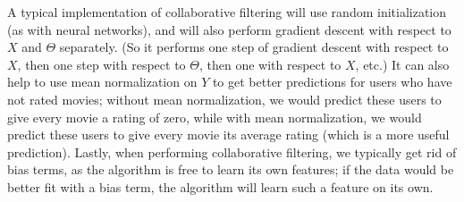 \documentclass{article}
\begin{document}
A typical implementation of collaborative filtering will use random initialization (as with neural networks), and will also perform gradient descent with respect to $X$ and $\Theta$ separately. (So it performs one step of gradient descent with respect to $X$, then one step with respect to $\Theta$, then one with respect to $X$, etc.) It can also help to use mean normalization on $Y$ to get better predictions for users who have not rated movies; without mean normalization, we would predict these users to give every movie a rating of zero, while with mean normalization, we would predict these users to give every movie its average rating (which is a more useful prediction). Lastly, when performing collaborative filtering, we typically get rid of bias terms, as the algorithm is free to learn its own features; if the data would be better fit with a bias term, the algorithm will learn such a feature on its own.
\end{document}
